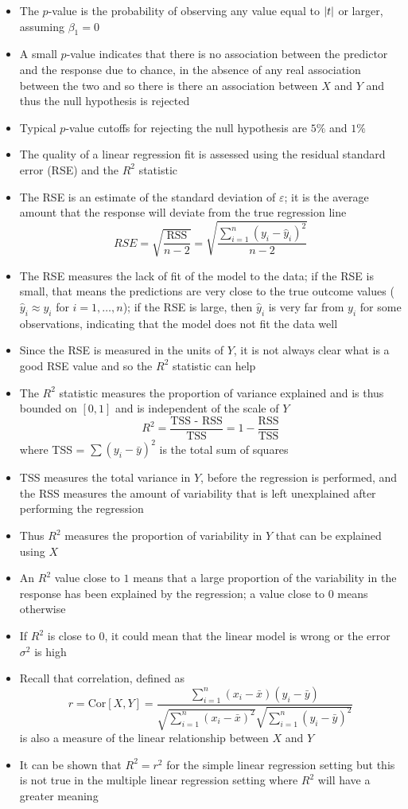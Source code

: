 \documentclass[12pt]{article}
\begin{document}
\begin{itemize}
\item The $p$-value is the probability of observing any value equal to $\abs{t}$ or larger, assuming $\beta_1 = 0$
\item A small $p$-value indicates that there is no association between the predictor and the response due to chance, in the absence of any real association between the two and so there is there an association between $X$ and $Y$ and thus the null hypothesis is rejected 
\item Typical $p$-value cutoffs for rejecting the null hypothesis are $5\%$ and $1\%$ 
\item The quality of a linear regression fit is assessed using the residual standard error (RSE) and the $R^2$ statistic 
\item The RSE is an estimate of the standard deviation of $\varepsilon$; it is the average amount that the response will deviate from the true regression line 
$$ RSE = \sqrt{\frac{\text{RSS}}{n-2}} = \sqrt{\frac{\sum_{i=1}^n (y_i - \hat{y}_i)^2}{n-2}} $$ 
\item The RSE measures the lack of fit of the model to the data; if the RSE is small, that means the predictions are very close to the true outcome values ($\hat{y}_i \approx y_i$ for $i = 1,\dots,n$); if the RSE is large, then $\hat{y}_i$ is very far from $y_i$ for some observations, indicating that the model does not fit the data well 
\item Since the RSE is measured in the units of $Y$, it is not always clear what is a good RSE value and so the $R^2$ statistic can help 
\item The $R^2$ statistic measures the proportion of variance explained and is thus bounded on $[0,1]$ and is independent of the scale of $Y$ $$R^2 = \frac{\text{TSS - RSS}}{\text{TSS}} = 1 - \frac{\text{RSS}}{\text{TSS}} $$ where TSS = $\sum (y_i - \bar{y})^2$ is the total sum of squares 
\item TSS measures the total variance in $Y$, before the regression is performed, and the RSS measures the amount of variability that is left unexplained after performing the regression 
\item Thus $R^2$ measures the proportion of variability in $Y$ that can be explained using $X$
\item An $R^2$ value close to $1$ means that a large proportion of the variability in the response has been explained by the regression; a value close to $0$ means otherwise
\item If $R^2$ is close to $0$, it could mean that the linear model is wrong or the error $\sigma^2$ is high 
\item Recall that correlation, defined as $$r = \text{Cor}[X,Y] = \frac{\sum_{i=1}^n (x_i - \bar{x})(y_i - \bar{y})}{\sqrt{\sum_{i=1}^n (x_i - \bar{x})^2} \sqrt{\sum_{i=1}^n (y_i - \bar{y})^2}} $$ is also a measure of the linear relationship between $X$ and $Y$
\item It can be shown that $R^2 = r^2$ for the simple linear regression setting but this is not true in the multiple linear regression setting where $R^2$ will have a greater meaning
\end{itemize} 
\end{document}
